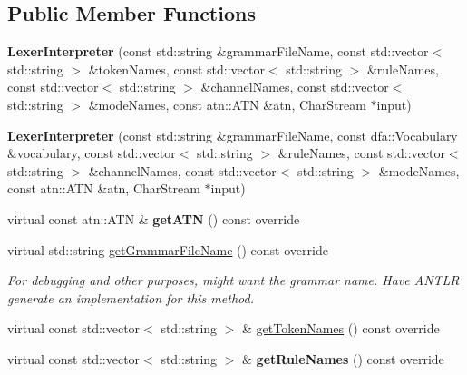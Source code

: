 \subsection*{Public Member Functions}
\begin{DoxyCompactItemize}
\item 
\mbox{\label{classantlr4_1_1LexerInterpreter_a5f122ef314cf8ed18b2e90f68bb77a86}} 
{\bfseries Lexer\+Interpreter} (const std\+::string \&grammar\+File\+Name, const std\+::vector$<$ std\+::string $>$ \&token\+Names, const std\+::vector$<$ std\+::string $>$ \&rule\+Names, const std\+::vector$<$ std\+::string $>$ \&channel\+Names, const std\+::vector$<$ std\+::string $>$ \&mode\+Names, const atn\+::\+A\+TN \&atn, Char\+Stream $\ast$input)
\item 
\mbox{\label{classantlr4_1_1LexerInterpreter_aafb828a0d0e2d76572124c266b74d468}} 
{\bfseries Lexer\+Interpreter} (const std\+::string \&grammar\+File\+Name, const dfa\+::\+Vocabulary \&vocabulary, const std\+::vector$<$ std\+::string $>$ \&rule\+Names, const std\+::vector$<$ std\+::string $>$ \&channel\+Names, const std\+::vector$<$ std\+::string $>$ \&mode\+Names, const atn\+::\+A\+TN \&atn, Char\+Stream $\ast$input)
\item 
\mbox{\label{classantlr4_1_1LexerInterpreter_aef0fdf477071a5645a8bf76cc47fe355}} 
virtual const atn\+::\+A\+TN \& {\bfseries get\+A\+TN} () const override
\item 
virtual std\+::string \hyperlink{classantlr4_1_1LexerInterpreter_a9f2f177e3a27be86cbb8b84d7bd3ca37}{get\+Grammar\+File\+Name} () const override
\begin{DoxyCompactList}\small\item\em For debugging and other purposes, might want the grammar name. Have A\+N\+T\+LR generate an implementation for this method. \end{DoxyCompactList}\item 
virtual const std\+::vector$<$ std\+::string $>$ \& \hyperlink{classantlr4_1_1LexerInterpreter_a09dd1700a39365debf06b10af7d34da6}{get\+Token\+Names} () const override
\item 
\mbox{\label{classantlr4_1_1LexerInterpreter_ab0eb5d50f5bfee5fb53130fdc786d3e1}} 
virtual const std\+::vector$<$ std\+::string $>$ \& {\bfseries get\+Rule\+Names} () const override

\end{DoxyCompactItemize}
